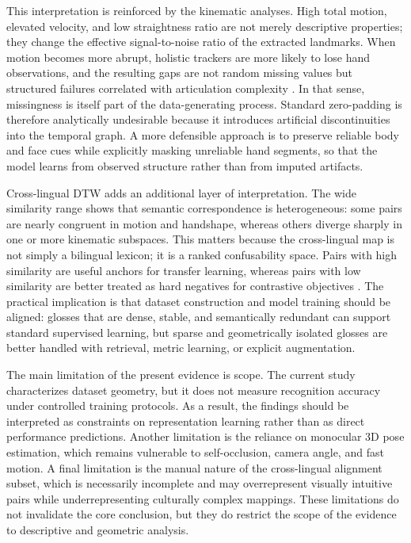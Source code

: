 \documentclass{ieeeaccess}
\begin{document}
This interpretation is reinforced by the kinematic analyses. High total motion, elevated velocity, and low straightness ratio are not merely descriptive properties; they change the effective signal-to-noise ratio of the extracted landmarks. When motion becomes more abrupt, holistic trackers are more likely to lose hand observations, and the resulting gaps are not random missing values but structured failures correlated with articulation complexity \cite{lugaresi2019mediapipe}. In that sense, missingness is itself part of the data-generating process. Standard zero-padding is therefore analytically undesirable because it introduces artificial discontinuities into the temporal graph. A more defensible approach is to preserve reliable body and face cues while explicitly masking unreliable hand segments, so that the model learns from observed structure rather than from imputed artifacts.

Cross-lingual DTW adds an additional layer of interpretation. The wide similarity range shows that semantic correspondence is heterogeneous: some pairs are nearly congruent in motion and handshape, whereas others diverge sharply in one or more kinematic subspaces. This matters because the cross-lingual map is not simply a bilingual lexicon; it is a ranked confusability space. Pairs with high similarity are useful anchors for transfer learning, whereas pairs with low similarity are better treated as hard negatives for contrastive objectives \cite{chen2020simple, robinson2020contrastive}. The practical implication is that dataset construction and model training should be aligned: glosses that are dense, stable, and semantically redundant can support standard supervised learning, but sparse and geometrically isolated glosses are better handled with retrieval, metric learning, or explicit augmentation.

The main limitation of the present evidence is scope. The current study characterizes dataset geometry, but it does not measure recognition accuracy under controlled training protocols. As a result, the findings should be interpreted as constraints on representation learning rather than as direct performance predictions. Another limitation is the reliance on monocular 3D pose estimation, which remains vulnerable to self-occlusion, camera angle, and fast motion. A final limitation is the manual nature of the cross-lingual alignment subset, which is necessarily incomplete and may overrepresent visually intuitive pairs while underrepresenting culturally complex mappings. These limitations do not invalidate the core conclusion, but they do restrict the scope of the evidence to descriptive and geometric analysis.
\end{document}
